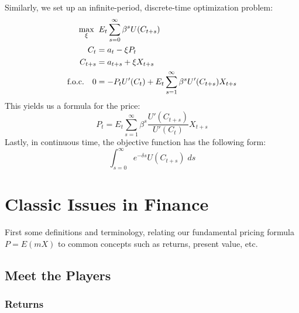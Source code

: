 \documentclass[a4paper,12pt]{scrartcl}
\begin{document}
Similarly, we set up an infinite-period, discrete-time 
optimization problem:
\begin{align}
    \max_{\xi} \; & \; 
	E_t \sum^\infty_{s=0} \beta^s U(C_{t+s})  \\
    C_t &= a_t - \xi P_t \notag \\
    C_{t+s} &= a_{t+s} + \xi X_{t+s} \notag \\  
    \text{f.o.c.} \quad 0 &= -P_t U'(C_t) +  
	E_t \sum^\infty_{s=1} \beta^s U'(C_{t+s}) X_{t+s}
\end{align}
This yields us a formula for the price:
\begin{equation}
    P_t =    
    E_t \sum^\infty_{s=1} \beta^s \frac{U'(C_{t+s})}{U'(C_t)} 
    X_{t+s}
\end{equation}
Lastly, in continuous time, the objective function has
the following form:
\begin{equation}
    \int^\infty_{s=0} e^{-\delta s}  U(C_{t+s})\; ds  
\end{equation}


\newpage
\section{Classic Issues in Finance}

First some definitions and terminology, relating our fundamental
pricing formula $P = E(mX)$ to common concepts such as 
returns, present value, etc.

\subsection{Meet the Players}

\subsubsection{Returns}
\end{document}
